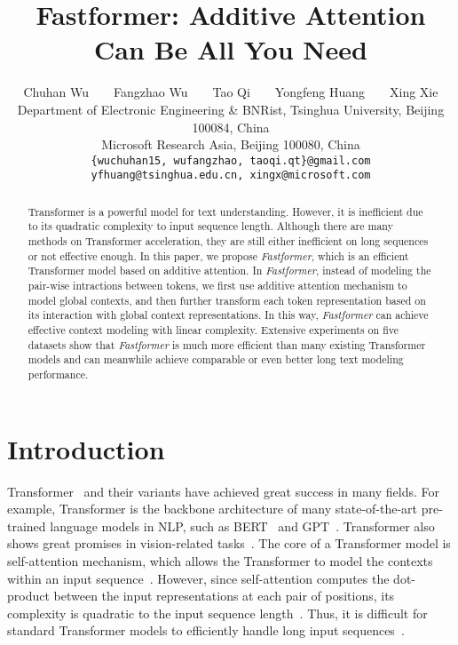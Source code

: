 \documentclass[11pt,a4paper]{article}
\title{Fastformer: Additive Attention Can Be All You Need}
\author{Chuhan Wu~~~~Fangzhao Wu~~~~Tao Qi~~~~Yongfeng Huang~~~~Xing Xie\\
    Department of Electronic Engineering \& BNRist, Tsinghua University, Beijing 100084, China  \\
     Microsoft Research Asia, Beijing 100080, China\\
  {\tt\{wuchuhan15, wufangzhao, taoqi.qt\}@gmail.com} \\ {\tt yfhuang@tsinghua.edu.cn, xingx@microsoft.com}
  }
\date{}
\begin{document}
\maketitle

\begin{abstract}

Transformer is a powerful model for text understanding.
However, it is inefficient due to its quadratic complexity to input sequence length.
Although there are many methods on Transformer acceleration, they are still either  inefficient on long sequences or not effective enough.
In this paper, we propose \textit{Fastformer}, which is an efficient Transformer model based on additive attention.
In \textit{Fastformer}, instead of modeling the pair-wise intractions between tokens, we first use additive attention mechanism to model global contexts, and then further transform each token representation based on its interaction with  global context representations.
In this way, \textit{Fastformer} can achieve effective context modeling with linear complexity.
Extensive experiments on five datasets show that \textit{Fastformer} is much more efficient than many existing Transformer models and can meanwhile achieve comparable or even better long text modeling performance.




\end{abstract}

\section{Introduction}

Transformer~\cite{vaswani2017attention} and their variants have achieved great success in many fields. For example, Transformer is the backbone architecture of many state-of-the-art pre-trained language models in NLP, such as BERT~\cite{devlin2019bert} and GPT~\cite{radford2019language}.
Transformer also shows great promises in vision-related tasks~\cite{dosovitskiy2020image}.
The core of a Transformer model is self-attention mechanism, which allows the Transformer to model the contexts within an input sequence~\cite{parikh2016decomposable}.
However, since self-attention computes the dot-product between the input representations at each pair of positions, its complexity is quadratic to the input sequence length~\cite{vaswani2017attention}.
Thus, it is difficult for standard Transformer models to efficiently handle long input sequences~\cite{tay2020efficient}.
\end{document}
